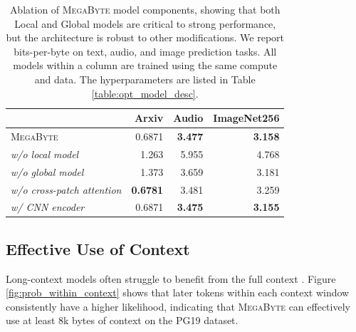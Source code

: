 \documentclass{article}
\newcommand{\fastslow}[0]{\textsc{MegaByte}\xspace}
\newcommand{\megabyte}[0]{\fastslow}
\newcommand{\mike}[1]{\textcolor{blue}{[Mike: #1]}}
\theoremstyle{plain}
\theoremstyle{definition}
\theoremstyle{remark}
\begin{document}
\begin{table}[h!t]
\centering\small
\begin{tabular}{lrrr}
\toprule
{}  & Arxiv & Audio & ImageNet256  \\
\midrule
\megabyte    & 0.6871 & \textbf{3.477} & \textbf{3.158}\\
\hspace{2pt} \textit{w/o local model}  & 1.263 & 5.955 & 4.768\\
\hspace{2pt} \textit{w/o global model}  & 1.373 &  3.659  & 3.181\\
\hspace{2pt} \textit{w/o cross-patch attention}  & \textbf{0.6781} & 3.481 &3.259 \\
\hspace{2pt} \textit{w/ CNN encoder}  & 0.6871 & \textbf{3.475} & \textbf{3.155}\\
\bottomrule
\end{tabular}
\caption{Ablation of \megabyte model components, showing that both Local and Global models are critical to strong performance, but the architecture is robust to other modifications. We report bits-per-byte on text, audio, and image prediction tasks. All models within a column are trained using the same compute and data. The hyperparameters are listed in Table \ref{table:opt_model_desc}. }
\label{tab:ablations}
\end{table}




\subsection{Effective Use of Context}
Long-context models often struggle to benefit from the full context \citep{sun2021long}. Figure \ref{fig:prob_within_context} shows that later tokens within each context window consistently have a higher likelihood, indicating that \megabyte can effectively use at least 8k bytes of context on the PG19 dataset. 
\end{document}
